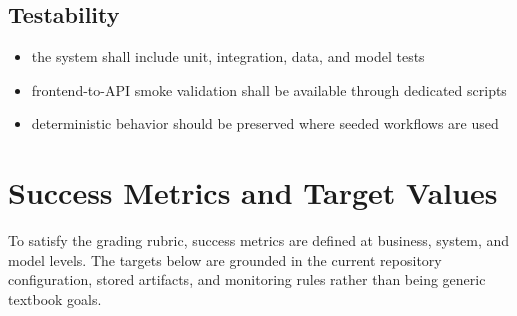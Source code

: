 \documentclass[11pt]{article}
\begin{document}
\subsection*{Testability}
\begin{itemize}
  \item the system shall include unit, integration, data, and model tests
  \item frontend-to-API smoke validation shall be available through dedicated scripts
  \item deterministic behavior should be preserved where seeded workflows are used
\end{itemize}

\section{Success Metrics and Target Values}
To satisfy the grading rubric, success metrics are defined at business, system, and model levels. The targets below are grounded in the current repository configuration, stored artifacts, and monitoring rules rather than being generic textbook goals.
\end{document}
